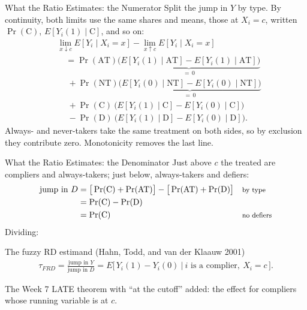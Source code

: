 \documentclass[aspectratio=169,11pt,xcolor=dvipsnames]{beamer}
\newcommand{\srcp}[1]{{\scriptsize\color{gray}(#1)}}
\newcommand{\E}{E}
\begin{document}
\begin{frame}{What the Ratio Estimates: the Numerator}
Split the jump in $Y$ by type. By continuity, both limits use the same shares
and means, those at $X_i = c$, written $\Pr(\text{C})$, $\E[Y_i(1)\mid \text{C}]$, and so on:
\begin{align*}
  &\lim_{x\downarrow c}\E[Y_i\mid X_i=x] - \lim_{x\uparrow c}\E[Y_i\mid X_i=x] \\
  &\quad= \Pr(\text{AT})\underbrace{\big(\E[Y_i(1)\mid \text{AT}] - \E[Y_i(1)\mid \text{AT}]\big)}_{=\,0} \\
  &\quad\ + \Pr(\text{NT})\underbrace{\big(\E[Y_i(0)\mid \text{NT}] - \E[Y_i(0)\mid \text{NT}]\big)}_{=\,0} \\
  &\quad\ + \Pr(\text{C})\ \big(\E[Y_i(1)\mid \text{C}] - \E[Y_i(0)\mid \text{C}]\big) \\
  &\quad\ - \Pr(\text{D})\ \big(\E[Y_i(1)\mid \text{D}] - \E[Y_i(0)\mid \text{D}]\big) .
\end{align*}
\vskip2pt
Always- and never-takers take the same treatment on both sides, so \alert{by
exclusion} they contribute zero. \alert{Monotonicity} removes the last line.
\end{frame}

\begin{frame}{What the Ratio Estimates: the Denominator}
Just above $c$ the treated are compliers and always-takers; just below, always-takers
and defiers:
\begin{align*}
  \text{jump in } D
  &= \big[\Pr(\text{C}) + \Pr(\text{AT})\big] - \big[\Pr(\text{AT}) + \Pr(\text{D})\big]
     && \text{\footnotesize by type} \\
  &= \Pr(\text{C}) - \Pr(\text{D}) \\
  &= \Pr(\text{C})
     && \text{\footnotesize no defiers}
\end{align*}
\vskip3pt
Dividing:
\begin{block}{The fuzzy RD estimand \srcp{Hahn, Todd, and van der Klaauw 2001}}
\begin{align*}
  \tau_{FRD} = \frac{\text{jump in } Y}{\text{jump in } D}
  = \E\big[\,Y_i(1) - Y_i(0)\ \big|\ \text{$i$ is a complier},\ X_i = c\,\big] .
\end{align*}
\end{block}
\vskip3pt
The Week 7 LATE theorem with ``at the cutoff'' added: the effect for
\alert{compliers whose running variable is at $c$}.
\end{frame}
\end{document}
